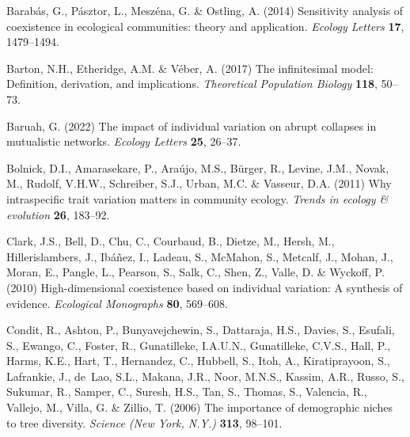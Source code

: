 \documentclass[11pt]{article}
\begin{document}
\begin{thebibliography}{51}
Barabás, G., Pásztor, L., Meszéna, G. \& Ostling, A. (2014) Sensitivity
  analysis of coexistence in ecological communities: theory and application.
  \emph{Ecology Letters} \textbf{17}, 1479--1494.

Barton, N.H., Etheridge, A.M. \& Véber, A. (2017) The infinitesimal model:
  {Definition}, derivation, and implications. \emph{Theoretical Population
  Biology} \textbf{118}, 50--73.

Baruah, G. (2022) The impact of individual variation on abrupt collapses in
  mutualistic networks. \emph{Ecology Letters} \textbf{25}, 26--37.

Bolnick, D.I., Amarasekare, P., Araújo, M.S., Bürger, R., Levine, J.M.,
  Novak, M., Rudolf, V.H.W., Schreiber, S.J., Urban, M.C. \& Vasseur, D.A.
  (2011) Why intraspecific trait variation matters in community ecology.
  \emph{Trends in ecology \& evolution} \textbf{26}, 183--92.

Clark, J.S., Bell, D., Chu, C., Courbaud, B., Dietze, M., Hersh, M.,
  Hillerislambers, J., Ibáñez, I., Ladeau, S., McMahon, S., Metcalf, J.,
  Mohan, J., Moran, E., Pangle, L., Pearson, S., Salk, C., Shen, Z., Valle, D.
  \& Wyckoff, P. (2010) High-dimensional coexistence based on individual
  variation: {A} synthesis of evidence. \emph{Ecological Monographs}
  \textbf{80}, 569--608.

Condit, R., Ashton, P., Bunyavejchewin, S., Dattaraja, H.S., Davies, S.,
  Esufali, S., Ewango, C., Foster, R., Gunatilleke, I.A.U.N., Gunatilleke,
  C.V.S., Hall, P., Harms, K.E., Hart, T., Hernandez, C., Hubbell, S., Itoh,
  A., Kiratiprayoon, S., Lafrankie, J., de~Lao, S.L., Makana, J.R., Noor,
  M.N.S., Kassim, A.R., Russo, S., Sukumar, R., Samper, C., Suresh, H.S., Tan,
  S., Thomas, S., Valencia, R., Vallejo, M., Villa, G. \& Zillio, T. (2006) The
  importance of demographic niches to tree diversity. \emph{Science (New York,
  N.Y.)} \textbf{313}, 98--101.


\end{thebibliography}
\end{document}
